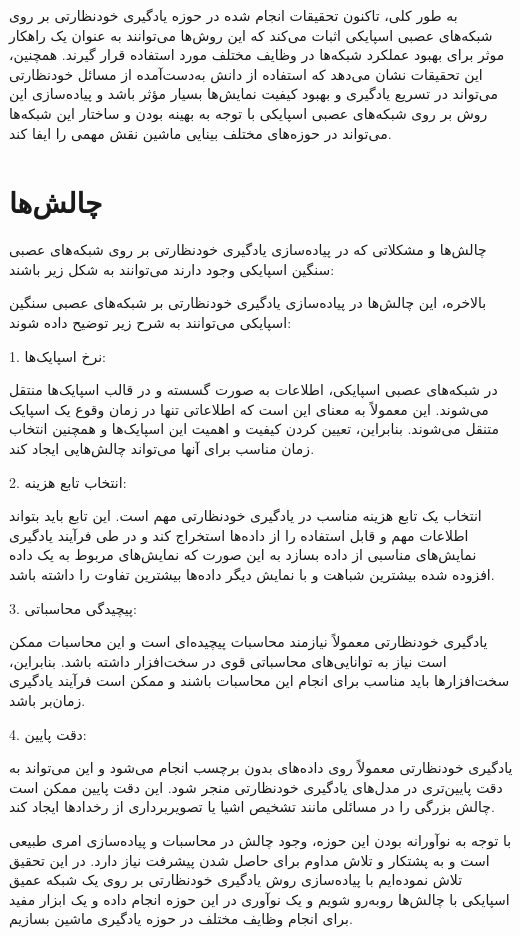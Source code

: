 به طور کلی، تاکنون تحقیقات انجام شده در حوزه‌ یادگیری خودنظارتی بر روی شبکه‌های عصبی اسپایکی اثبات می‌کند که این روش‌ها می‌توانند به عنوان یک راهکار موثر برای بهبود عملکرد شبکه‌ها در وظایف مختلف مورد استفاده قرار گیرند. همچنین، این تحقیقات نشان می‌دهد که استفاده از دانش به‌دست‌آمده از مسائل خودنظارتی می‌تواند در تسریع یادگیری و بهبود کیفیت نمایش‌ها بسیار مؤثر باشد و پیاده‌سازی این روش‌ بر روی شبکه‌های عصبی اسپایکی با توجه به بهینه بودن و ساختار این شبکه‌ها می‌تواند در حوزه‌های مختلف بینایی ماشین نقش مهمی را ایفا کند.


\section{چالش‌ها}

چالش‌ها و مشکلاتی که در پیاده‌سازی یادگیری خودنظارتی بر روی شبکه‌های عصبی سنگین اسپایکی وجود دارند می‌توانند به شکل زیر باشند:


بالاخره، این چالش‌ها در پیاده‌سازی یادگیری خودنظارتی بر شبکه‌های عصبی سنگین اسپایکی می‌توانند به شرح زیر توضیح داده شوند:

1. نرخ اسپایک‌ها: 

در شبکه‌های عصبی اسپایکی، اطلاعات به صورت گسسته و در قالب اسپایک‌ها منتقل می‌شوند. این معمولاً به معنای این است که اطلاعاتی تنها در زمان وقوع یک اسپایک متنقل می‌شوند. بنابراین، تعیین کردن کیفیت و اهمیت این اسپایک‌ها و همچنین انتخاب زمان مناسب برای آنها می‌تواند چالش‌هایی ایجاد کند.

2. انتخاب تابع هزینه:

 انتخاب یک تابع هزینه مناسب در یادگیری خودنظارتی مهم است. این تابع باید بتواند اطلاعات مهم و قابل استفاده را از داده‌ها استخراج کند و در طی فرآیند یادگیری نمایش‌های مناسبی از داده بسازد به این صورت که نمایش‌های مربوط به یک داده افزوده شده بیشترین شباهت و با نمایش دیگر داده‌ها بیشترین تفاوت را داشته باشد. 

3. پیچیدگی محاسباتی: 

یادگیری خودنظارتی معمولاً نیازمند محاسبات پیچیده‌ای است و این محاسبات ممکن است نیاز به توانایی‌های محاسباتی قوی در سخت‌افزار داشته باشد. بنابراین، سخت‌افزارها باید مناسب برای انجام این محاسبات باشند و ممکن است فرآیند یادگیری زمان‌بر باشد.

4. دقت پایین: 

یادگیری خودنظارتی معمولاً روی داده‌های بدون برچسب انجام می‌شود و این می‌تواند به دقت پایین‌تری در مدل‌های یادگیری خودنظارتی منجر شود. این دقت پایین ممکن است چالش بزرگی را در مسائلی مانند تشخیص اشیا یا تصویربرداری از رخدادها ایجاد کند.


با توجه به نوآورانه بودن این حوزه، وجود چالش در محاسبات و پیاده‌سازی امری طبیعی است و به پشتکار و تلاش مداوم برای حاصل شدن پیشرفت نیاز دارد. در این تحقیق تلاش نموده‌ایم با پیاده‌سازی روش یادگیری خودنظارتی بر روی یک شبکه عمیق اسپایکی با چالش‌ها روبه‌رو شویم و یک نوآوری در این حوزه انجام داده و یک ابزار مفید برای انجام وظایف مختلف در حوزه یادگیری ماشین بسازیم.
